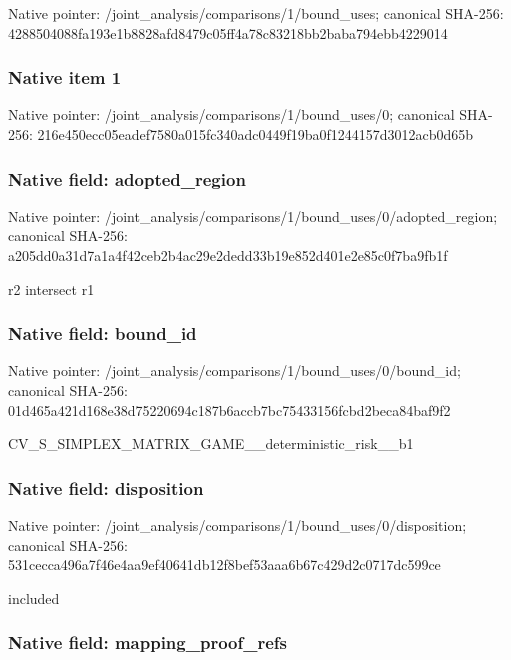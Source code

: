 \documentclass[10pt,a4paper]{article}
\begin{document}
Native pointer: /joint\_analysis/comparis\allowbreak{}ons/1/bound\_uses; canonical SHA-256: 4288504088fa193e1b8828af\allowbreak{}d8479c05ff4a78c83218bb2b\allowbreak{}aba794ebb4229014



\subsubsection{Native item 1}


Native pointer: /joint\_analysis/comparis\allowbreak{}ons/1/bound\_uses/0; canonical SHA-256: 216e450ecc05eadef7580a01\allowbreak{}5fc340adc0449f19ba0f1244\allowbreak{}157d3012acb0d65b



\subsubsection{Native field: adopted\_region}


Native pointer: /joint\_analysis/comparis\allowbreak{}ons/1/bound\_uses/0/adopt\allowbreak{}ed\_region; canonical SHA-256: a205dd0a31d7a1a4f42ceb2b\allowbreak{}4ac29e2dedd33b19e852d401\allowbreak{}e2e85c0f7ba9fb1f


r2 intersect r1


\subsubsection{Native field: bound\_id}


Native pointer: /joint\_analysis/comparis\allowbreak{}ons/1/bound\_uses/0/bound\allowbreak{}\_id; canonical SHA-256: 01d465a421d168e38d752206\allowbreak{}94c187b6accb7bc75433156f\allowbreak{}cbd2beca84baf9f2


CV\_S\_SIMPLEX\_MATRIX\_GAME\allowbreak{}\_\_deterministic\_risk\_\_b1


\subsubsection{Native field: disposition}


Native pointer: /joint\_analysis/comparis\allowbreak{}ons/1/bound\_uses/0/dispo\allowbreak{}sition; canonical SHA-256: 531cecca496a7f46e4aa9ef4\allowbreak{}0641db12f8bef53aaa6b67c4\allowbreak{}29d2c0717dc599ce


included


\subsubsection{Native field: mapping\_proof\_refs}
\end{document}
